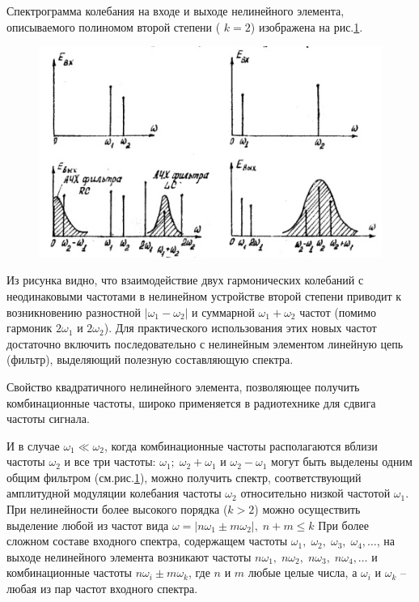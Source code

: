 Спектрограмма колебания на входе и выходе нелинейного элемента, описываемого полиномом второй степени ( $k=2$) изображена на рис.\ref{pic:4}.
\begin{figure}[h!]
	\centering
	\includegraphics[width=0.8\linewidth]{picture/pic4.jpg}
	\caption{}
	\label{pic:4}
\end{figure}

Из рисунка видно, что взаимодействие двух гармонических колебаний с неодинаковыми частотами в нелинейном устройстве второй степени приводит к возникновению разностной $|\omega_1-\omega_2|$ и суммарной $\omega_1+\omega_2$ частот (помимо гармоник $2\omega_1$	и $2\omega_2$).
Для практического использования этих новых частот достаточно включить последовательно с нелинейным элементом линейную цепь (фильтр), выделяющий полезную составляющую спектра.

Свойство квадратичного нелинейного элемента, позволяющее получить комбинационные частоты, широко применяется в радиотехнике для сдвига частоты сигнала.

И в случае $\omega_1\ll\omega_2$, когда комбинационные частоты располагаются вблизи частоты $\omega_2$ и  все три частоты: $\omega_1;\;\omega_2+\omega_1$ и $\omega_2-\omega_1$ могут быть выделены одним общим фильтром (см.рис.\ref{pic:4}), можно получить спектр, соответствующий амплитудной модуляции колебания частоты $\omega_2$ относительно низкой частотой $\omega_1$. При нелинейности более высокого порядка ($k>2$) можно осуществить выделение любой из частот вида $\omega=|n\omega_1\pm m\omega_2|,\;n+m\leq k$
При более сложном составе входного спектра, содержащем частоты $\omega_1,\;\omega_2,\;\omega_3,\;\omega_4,\ldots$, на выходе нелинейного элемента возникают частоты $n\omega_1,\;n\omega_2,\;n\omega_3,\;n\omega_4,\ldots$ и комбинационные
частоты	$n\omega_i\pm m\omega_k$, где $n$ и $m$ любые целые числа, а $\omega_i$ и $\omega_k$ -- любая из пар частот входного спектра.
